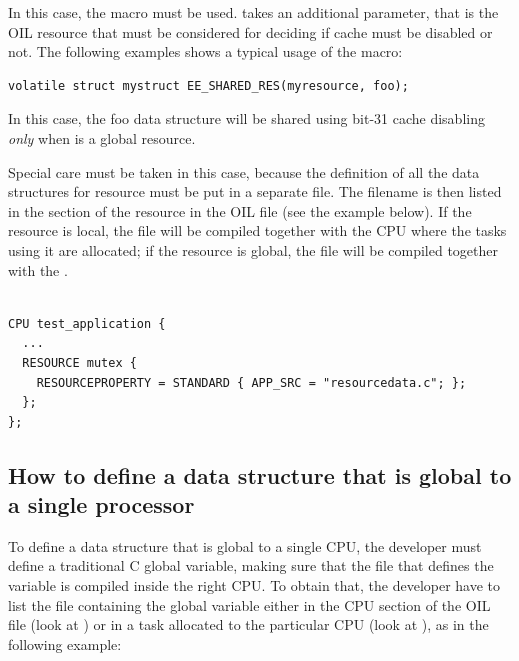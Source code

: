 In this case, the  macro
must be used.   takes an additional parameter,
that is the OIL resource that must be considered for deciding if cache
must be disabled or not. The following examples shows a typical usage
of the macro:

\begin{lstlisting}
volatile struct mystruct EE_SHARED_RES(myresource, foo);
\end{lstlisting}

In this case, the foo data structure will be shared using bit-31 cache
disabling {\em only} when  is a global resource.

\begin{warning}
Special care must be taken in this case, because the definition of all
the data structures for resource  must be put in a
separate file. The filename is then listed in the 
section of the  resource in the OIL file (see the
example below).  If the resource is local, the file will be compiled
together with the CPU where the tasks using it are allocated; if the
resource is global, the file will be compiled together with the
.

\begin{lstlisting}

CPU test_application {
  ...
  RESOURCE mutex {
    RESOURCEPROPERTY = STANDARD { APP_SRC = "resourcedata.c"; };
  };
};
\end{lstlisting}
\end{warning}







\subsection{How to define a data structure that is global to a 
single processor}

To define a data structure that is global to a single CPU, the
developer must define a traditional C global variable, making sure
that the file that defines the variable is compiled inside the right
CPU. To obtain that, the developer have to list the file containing
the global variable either in the CPU section of the OIL file (look at
) or in a task allocated to the particular CPU (look
at ), as in the following example:


